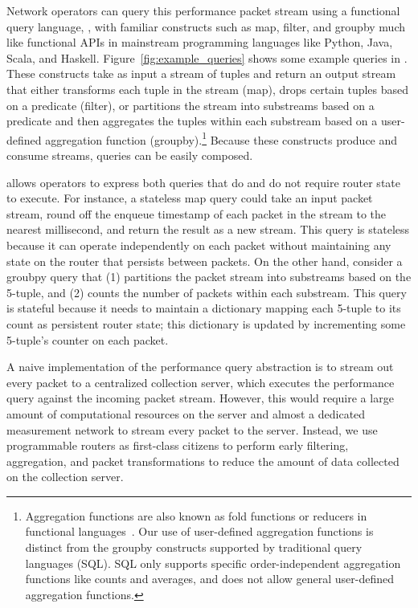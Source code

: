 Network operators can query this performance packet stream using a functional
query language, \TheSystem, with familiar constructs such as {\ct map}, {\ct
filter}, and {\ct groupby} much like functional APIs in mainstream programming
languages like Python, Java, Scala, and Haskell. Figure~\ref{fig:example_queries}
shows some example queries in \TheSystem. These constructs take as input
a stream of tuples and return an output stream that either transforms each
tuple in the stream ({\ct map}), drops certain tuples based on a predicate
({\ct filter}), or partitions the stream into substreams based on a predicate
and then aggregates the tuples within each substream based on a user-defined
aggregation function ({\ct groupby}).\footnote{Aggregation functions are also
known as fold functions or reducers in functional languages~\cite{haskell,
lisp}.  Our use of user-defined aggregation functions is distinct from the
groupby constructs supported by traditional query languages (\eg SQL). SQL only
supports specific order-independent aggregation functions like counts and
averages, and does not allow general user-defined aggregation functions.}
Because these constructs produce and consume streams, \TheSystem queries can be
easily composed.

\TheSystem allows operators to express both queries that do and do not require
router state to execute. For instance, a stateless {\ct map} query could take
an input packet stream, round off the enqueue timestamp of each packet in the
stream to the nearest millisecond, and return the result as a new stream.  This
query is stateless because it can operate independently on each packet without
maintaining any state on the router that persists between packets. On the other
hand, consider a {\ct groubpy} query that (1) partitions the packet stream into
substreams based on the 5-tuple, and (2) counts the number of packets within
each substream. This query is stateful because it needs to maintain a
dictionary mapping each 5-tuple to its count as persistent router state; this
dictionary is updated by incrementing some 5-tuple's counter on each packet.


A naive implementation of the performance query abstraction is to stream out
every packet to a centralized collection server, which executes the performance
query against the incoming packet stream. However, this would require a large
amount of computational resources on the server and almost a dedicated
measurement network to stream every packet to the server. Instead, we use
programmable routers as first-class citizens to perform early filtering,
aggregation, and packet transformations to reduce the amount of data collected
on the collection server.

